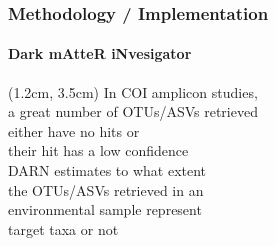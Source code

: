 \documentclass{beamer}
\begin{document}
   \begin{frame}
      \frametitle{Methodology / Implementation}
      \framesubtitle{Dark mAtteR iNvesigator}

      \begin{textblock*}{7cm}(1.2cm, 3.5cm)
         \small In COI amplicon studies, \\
         \small a great number of OTUs/ASVs retrieved \\
         \small either have no hits or \\
         \small their hit has a low confidence \\
         \bigskip
         \small DARN estimates to what extent \\
         \small the OTUs/ASVs retrieved in an \\ 
         \small environmental sample represent \\ 
         \small target taxa or not 
      \end{textblock*}

      \begin{singlespace}
      \end{singlespace}
   \end{frame}
\end{document}

